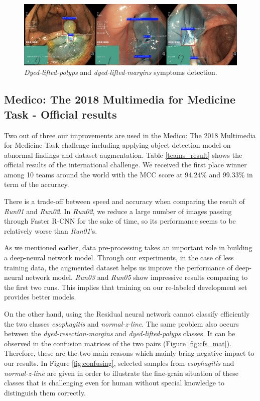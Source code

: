 \begin{figure}[thb]
\begin{center}
\includegraphics[width=\textwidth]{endoscopy_resources/res_frcnn_dyed_lifted_polyps.png}
\end{center}
   \caption{\textit{Dyed-lifted-polyps} and \textit{dyed-lifted-margins} symptoms detection.}
\label{fig:res_frcnn_dyed}
\end{figure}

\subsection{Medico: The 2018 Multimedia for Medicine Task - Official results}
\label{sec:medico2018_results}
Two out of three our improvements are used in the Medico: The 2018 Multimedia for Medicine Task challenge including applying object detection model on abnormal findings and dataset augmentation. Table \ref{teams_result} shows the official results of the international challenge. We received the first place winner among 10 teams around the world with the MCC score at 94.24\% and 99.33\% in term of the accuracy.

There is a trade-off between speed and accuracy when comparing the result of \textit{Run01} and \textit{Run02}. In \textit{Run02}, we reduce a large number of images passing through Faster R-CNN for the sake of time, so its performance seems to be relatively worse than \textit{Run01}'s.

As we mentioned earlier, data pre-processing takes an important role in building a deep-neural network model. Through our experiments, in the case of less training data, the augmented dataset helps us improve the performance of deep-neural network model. \textit{Run03} and \textit{Run05} show impressive results comparing to the first two runs. This implies that training on our re-labeled development set provides better models.

On the other hand, using the Residual neural network cannot classify efficiently the two classes \textit{esophagitis} and \textit{normal-z-line}. The same problem also occurs between the \textit{dyed-resection-margins} and \textit{dyed-lifted-polyps} classes. It can be observed in the confusion matrices of the two pairs (Figure \ref{fig:cfs_mat}). Therefore, these are the two main reasons which mainly bring negative impact to our results. In Figure \ref{fig:confusing}, selected samples from \textit{esophagitis} and \textit{normal-z-line} are given in order to illustrate the fine-grain situation of these classes that is challenging even for human without special knowledge to distinguish them correctly.

